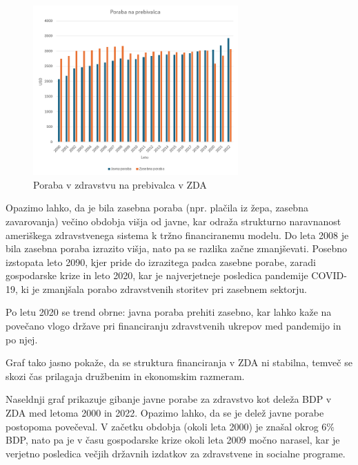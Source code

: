 \documentclass[12pt,a4paper]{article}
\theoremstyle{definition}
\begin{document}
\begin{figure}[htbp]
    \centering
    \includegraphics[width=0.7\textwidth]{zda_poraba_na_prebivalca.png}
    \caption{Poraba v zdravstvu na prebivalca v ZDA}
    \label{fig:zda_poraba_na_prebivalca}
\end{figure}

Opazimo lahko, da je bila zasebna poraba (npr. plačila iz žepa, zasebna zavarovanja) večino obdobja višja od javne, 
kar odraža strukturno naravnanost ameriškega zdravstvenega sistema k tržno financiranemu modelu. 
Do leta 2008 je bila zasebna poraba izrazito višja, nato pa se razlika začne zmanjševati. 
Posebno izstopata leto 2090, kjer pride do izrazitega padca zasebne porabe, zaradi gospodarske krize in leto 2020, 
kar je najverjetneje posledica pandemije COVID-19, ki je zmanjšala porabo zdravstvenih storitev pri zasebnem sektorju.

Po letu 2020 se trend obrne: javna poraba prehiti zasebno, 
kar lahko kaže na povečano vlogo države pri financiranju zdravstvenih ukrepov med pandemijo in po njej. 

Graf tako jasno pokaže, da se struktura financiranja v ZDA ni stabilna, 
temveč se skozi čas prilagaja družbenim in ekonomskim razmeram.

Naseldnji graf prikazuje gibanje javne porabe za zdravstvo kot deleža BDP v ZDA med letoma 2000 in 2022. 
Opazimo lahko, da se je delež javne porabe postopoma povečeval. 
V začetku obdobja (okoli leta 2000) je znašal okrog $6 \%$ BDP, 
nato pa je v času gospodarske krize okoli leta 2009 močno narasel, 
kar je verjetno posledica večjih državnih izdatkov za zdravstvene in socialne programe.
\end{document}
